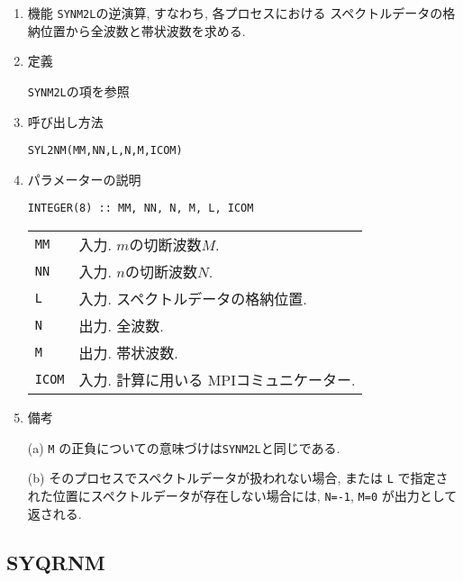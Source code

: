 \documentclass[a4j]{jsarticle}
\begin{document}
\begin{enumerate}

\item 機能 
\texttt{SYNM2L}の逆演算, すなわち, 各プロセスにおける
スペクトルデータの格納位置から全波数と帯状波数を求める.

\item 定義

\texttt{SYNM2L}の項を参照

\item 呼び出し方法 
    
\texttt{SYL2NM(MM,NN,L,N,M,ICOM)}
  
\item パラメーターの説明

\begin{verbatim}
INTEGER(8) :: MM, NN, N, M, L, ICOM
\end{verbatim}    

\begin{tabular}{ll}
\texttt{MM} & 入力. $m$の切断波数$M$.\\  
\texttt{NN} & 入力. $n$の切断波数$N$.\\
\texttt{L} & 入力. スペクトルデータの格納位置.\\
\texttt{N} & 出力. 全波数.\\
\texttt{M} & 出力. 帯状波数.\\
\texttt{ICOM} & 入力. 計算に用いる MPIコミュニケーター.
\end{tabular}

\item 備考

(a)  \texttt{M} の正負についての意味づけは\texttt{SYNM2L}と同じである.

(b) そのプロセスでスペクトルデータが扱われない場合, または \texttt{L}
    で指定された位置にスペクトルデータが存在しない場合には, \texttt{N=-1}, 
    \texttt{M=0} が出力として返される.

\end{enumerate}


\subsection{SYQRNM}
\end{document}
